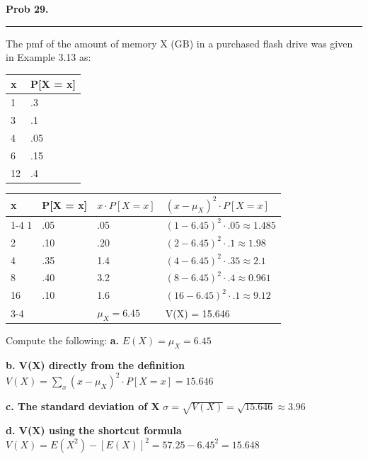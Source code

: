 \textbf{Prob 29.} \\
\hrule 

The pmf of the amount of memory X (GB) in a purchased flash drive was given in Example 3.13 as:

\begin{table}[h]
\begin{tabular}{ll}
\hline
x & P{[}X = x{]} \\ \hline
1 & .3 \\
3 & .1 \\
4 & .05 \\
6 & .15 \\
12 & .4
\end{tabular}
\end{table}

\begin{table}[h]
\begin{tabular}{llll}
x & P[X = x] & $x \cdot P[X = x]$ & $(x - \mu_X)^2 \cdot P[X = x]$ \\[1mm] \cline{1-4}
1 & .05 & .05 & $(1-6.45)^2 \cdot .05 \approx 1.485$ \\[1mm]
2 & .10 & .20 & $(2-6.45)^2 \cdot .1 \approx 1.98$ \\[1mm]
4 & .35 & 1.4 & $(4-6.45)^2 \cdot .35 \approx 2.1$ \\[1mm]
8 & .40 & 3.2 & $(8-6.45)^2 \cdot .4 \approx 0.961$ \\[1mm]
16 & .10 & 1.6 & $(16-6.45)^2 \cdot .1 \approx 9.12$ \\[1mm] \cline{3-4}
 &  & $\mu_X = 6.45$ & V(X) = 15.646
\end{tabular}
\end{table}

Compute the following: \newline 
\textbf{a.} $E(X) = \mu_X = \boxed{6.45}$

\textbf{b. V(X) directly from the definition} \newline 
$V(X) = \sum_{x}(x-\mu_X)^2 \cdot P[X = x] = \boxed{15.646}$

\textbf{c. The standard deviation of X} \newline 
$\sigma = \sqrt{V(X)} = \sqrt{15.646} \approx \boxed{3.96}$

\textbf{d. V(X) using the shortcut formula} \newline 
$V(X) = E(X^2) - [E(X)]^2 = 57.25 - 6.45^2 = \boxed{15.648}$